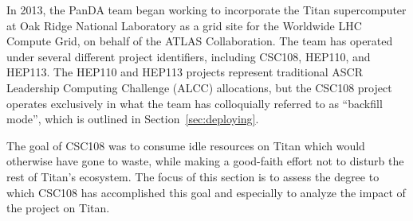 
%
%


In 2013, the PanDA team began working to incorporate the Titan supercomputer at
Oak Ridge National Laboratory as a grid site for the Worldwide LHC Compute
Grid, on behalf of the ATLAS Collaboration. The team has operated under several
different project identifiers, including CSC108, HEP110, and HEP113. The HEP110
and HEP113 projects represent traditional ASCR Leadership Computing Challenge
(ALCC) allocations, but the CSC108 project operates exclusively in what the
team has colloquially referred to as ``backfill mode'', which is outlined in
Section~\ref{sec:deploying}. 


The goal of CSC108 was to consume idle resources on Titan which would
otherwise have gone to waste, while making a good-faith effort not to disturb
the rest of Titan's ecosystem. The focus of this section is to assess the
degree to which CSC108 has accomplished this goal and especially to analyze
the impact of the project on Titan.



